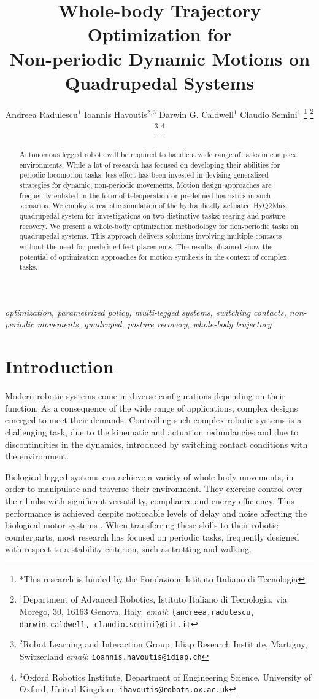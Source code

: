 \documentclass[usletter, 10pt, conference]{ieeeconf}      %
\title{\LARGE \bf Whole-body Trajectory Optimization for \\ Non-periodic Dynamic 
Motions on Quadrupedal Systems}
\author{Andreea Radulescu$^{1}$  Ioannis Havoutis$^{2,3}$ Darwin G. Caldwell$^1$ Claudio Semini$^{1}$ 
\thanks{*This research is funded by the Fondazione Istituto Italiano di Tecnologia}%
\thanks{$^{1}$Department of Advanced Robotics, Istituto Italiano di
Tecnologia, via Morego, 30, 16163 Genova, Italy. \textit{email}: 
        {\tt\small \{andreea.radulescu, darwin.caldwell,  claudio.semini\}@iit.it}}%
\thanks{$^{2}$Robot Learning and Interaction Group, Idiap Research Institute, 
Martigny, Switzerland \textit{email}: {\tt\small ioannis.havoutis@idiap.ch}}%
\thanks{$^{3}$Oxford Robotics Institute, Department of Engineering Science, University of Oxford, United Kingdom. {\tt\small ihavoutis@robots.ox.ac.uk}}%
}
\begin{document}
\maketitle
\thispagestyle{empty}
\pagestyle{empty}

\begin{abstract}
Autonomous legged robots will be required to handle a wide range of tasks 
in complex environments. While a lot of research has focused on developing 
their abilities for periodic locomotion tasks, less effort has been invested 
in devising generalized strategies for dynamic, 
non-periodic movements. Motion design approaches are frequently enlisted in the form of 
teleoperation or predefined heuristics in such scenarios. We employ a realistic 
simulation of the hydraulically actuated HyQ2Max quadrupedal system for 
investigations on two distinctive tasks: rearing and posture recovery. 
We present a whole-body optimization methodology for non-periodic tasks on quadrupedal systems. 
This approach delivers solutions involving multiple contacts without 
the need for predefined feet placements. 
The results obtained show the potential of optimization approaches for 
motion synthesis in the context of complex tasks.
\end{abstract}

\begin{keywords}
\textit{optimization, parametrized policy, multi-legged systems, switching contacts,
non-periodic movements, quadruped, posture recovery, whole-body trajectory}
\end{keywords}

\section{Introduction}

Modern robotic systems come in diverse configurations depending on their function. 
As a consequence of the wide range of applications, complex designs emerged to meet their demands.
Controlling such complex robotic systems is a challenging task, 
due to the kinematic and actuation redundancies and due to discontinuities in the 
dynamics, introduced by switching contact conditions with the environment. 

Biological legged systems can achieve a variety of whole body movements, in order to manipulate
and traverse their environment. They exercise control over their limbs with significant versatility, compliance and energy 
efficiency. This performance is achieved despite noticeable levels of delay and noise affecting the biological 
motor systems \cite{faisal2008noise}. When transferring these skills to their robotic counterparts,
most research has focused on periodic tasks, frequently designed with respect to a stability criterion, such as trotting and walking. 
\end{document}

